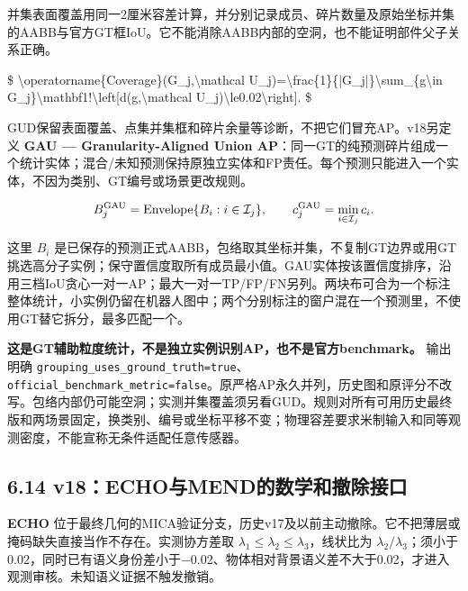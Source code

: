 \documentclass[UTF8,fontset=fandol]{ctexart}
\begin{document}
并集表面覆盖用同一2厘米容差计算，并分别记录成员、碎片数量及原始坐标并集的AABB与官方GT框IoU。它不能消除AABB内部的空洞，也不能证明部件父子关系正确。



\$
\textbackslash{}operatorname\{Coverage\}(G\_j,\textbackslash{}mathcal U\_j)=\textbackslash{}frac\{1\}\{|G\_j|\}\textbackslash{}sum\_\{g\textbackslash{}in G\_j\}\textbackslash{}mathbf1!\textbackslash{}left[d(g,\textbackslash{}mathcal U\_j)\textbackslash{}le0.02\textbackslash{}right].
\$



GUD保留表面覆盖、点集并集框和碎片余量等诊断，不把它们冒充AP。v18另定义 \textbf{GAU — Granularity-Aligned Union AP}：同一GT的纯预测碎片组成一个统计实体；混合/未知预测保持原独立实体和FP责任。每个预测只能进入一个实体，不因为类别、GT编号或场景更改规则。



\[
B^{\rm GAU}_j=\operatorname{Envelope}\{B_i:i\in\mathcal I_j\},\qquad
c^{\rm GAU}_j=\min_{i\in\mathcal I_j}c_i.
\]

这里 $B_i$ 是已保存的预测正式AABB，包络取其坐标并集，不复制GT边界或用GT挑选高分子实例；保守置信度取所有成员最小值。GAU实体按该置信度排序，沿用三档IoU贪心一对一AP；最大一对一TP/FP/FN另列。两块布可合为一个标注整体统计，小实例仍留在机器人图中；两个分别标注的窗户混在一个预测里，不使用GT替它拆分，最多匹配一个。



\textbf{这是GT辅助粒度统计，不是独立实例识别AP，也不是官方benchmark。} 输出明确 \texttt{grouping\_\allowbreak{}uses\_\allowbreak{}ground\_\allowbreak{}truth=true}、\texttt{official\_\allowbreak{}benchmark\_\allowbreak{}metric=false}。原严格AP永久并列，历史图和原评分不改写。包络内部仍可能空洞；实测并集覆盖须另看GUD。规则对所有可用历史最终版和两场景固定，换类别、编号或坐标平移不变；物理容差要求米制输入和同等观测密度，不能宣称无条件适配任意传感器。



\subsection*{6.14 v18：ECHO与MEND的数学和撤除接口}

\textbf{ECHO} 位于最终几何的MICA验证分支，历史v17及以前主动撤除。它不把薄层或掩码缺失直接当作不存在。实测协方差取 $\lambda_1\le\lambda_2\le\lambda_3$，线状比为 $\lambda_2/\lambda_3$；须小于0.02，同时已有语义身份差小于−0.02、物体相对背景语义差不大于0.02，才进入观测审核。未知语义证据不触发撤销。
\end{document}
